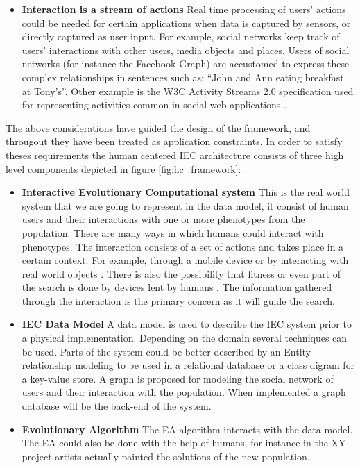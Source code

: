 \begin{itemize}
\item {\bf Interaction is a stream of actions}
  Real time processing of users' actions could be needed for certain applications when data is 
  captured by sensors, or directly captured as user input. For example, social networks keep
  track of users' interactions with other users, media objects and places. Users of 
  social networks (for instance the Facebook Graph) are accustomed to express these 
  complex relationships in sentences such as: ``John and Ann eating breakfast at Tony's''. 
  Other example is the W3C Activity Streams 2.0 specification used for representing activities 
  common in social web applications \cite{json:streams}. 
\end{itemize}

The above considerations have guided the design of the framework, and througout they have been
treated as application constraints. In order to satisfy theses requirements the
human centered IEC architecture consists of three high level components depicted
in figure \ref{fig:hc_framework}:

\begin{itemize}
  \item {\bf Interactive Evolutionary Computational system} 
  This is the real world system that we are going to represent in the data model, 
  it consist of human users and their interactions with one or more phenotypes
  from the population. There are many ways in which humans could interact 
  with phenotypes. The interaction consists of a set of actions and 
  takes place in a certain context. For example, through a mobile device  
  or by interacting with real world objects 
  \cite{de2014artists,de2013unplugging}. 
  There is also the possibility that fitness or even part of the search 
  is done by devices lent by humans \cite{DBLP:conf/gecco/MereloCGCRV16}.
  The information gathered through the interaction is the primary concern
  as it will guide the search. 

  \item {\bf IEC Data Model}
  A data model is used to describe the IEC system prior to a physical 
  implementation.  Depending on the domain several techniques can be used.
  Parts of the system could be better described by an Entity relationship 
  modeling to be used in a relational database or a class digram for a 
  key-value store. A graph is proposed for modeling the social network of users 
  and their interaction with the population. When implemented a graph database 
  will be the back-end of the system. 

  \item {\bf Evolutionary Algorithm} 
  The EA algorithm interacts with the data model. The EA could also be done with the help of
  humans, for instance in the XY project \cite{de2013unplugging} artists actually painted
  the solutions of the new population.  
\end{itemize}

